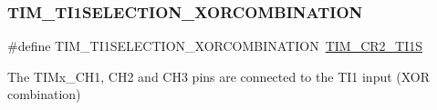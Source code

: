 \subsubsection{\texorpdfstring{TIM\_TI1SELECTION\_XORCOMBINATION}{TIM\_TI1SELECTION\_XORCOMBINATION}}
{\footnotesize\ttfamily \#define T\+I\+M\+\_\+\+T\+I1\+S\+E\+L\+E\+C\+T\+I\+O\+N\+\_\+\+X\+O\+R\+C\+O\+M\+B\+I\+N\+A\+T\+I\+ON~\mbox{\hyperlink{group___peripheral___registers___bits___definition_gad07504497b70af628fa1aee8fe7ef63c}{T\+I\+M\+\_\+\+C\+R2\+\_\+\+T\+I1S}}}

The T\+I\+Mx\+\_\+\+C\+H1, C\+H2 and C\+H3 pins are connected to the T\+I1 input (X\+OR combination) 